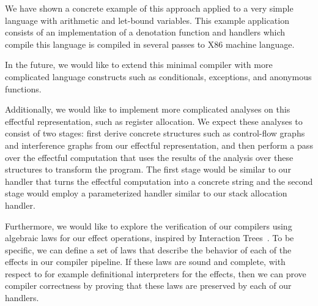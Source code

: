 \documentclass[a4paper,UKenglish,cleveref, autoref, thm-restate]{oasics-v2021}
\begin{document}
We have shown a concrete example of this approach applied to a very simple language with arithmetic and let-bound variables.
This example application consists of an implementation of a denotation function and handlers which compile this language is compiled in several passes to X86 machine language.

In the future, we would like to extend this minimal compiler with more complicated language constructs such as conditionals, exceptions, and anonymous functions.

Additionally, we would like to implement more complicated analyses on this effectful representation, such as register allocation.
We expect these analyses to consist of two stages: first derive concrete structures such as control-flow graphs and interference graphs from our effectful representation, and then perform a pass over the effectful computation that uses the results of the analysis over these structures to transform the program.
The first stage would be similar to our handler that turns the effectful computation into a concrete string and the second stage would employ a parameterized handler similar to our stack allocation handler.

Furthermore, we would like to explore the verification of our compilers using algebraic laws for our effect operations, inspired by Interaction Trees~\cite{10.1145/3371119}.
To be specific, we can define a set of laws that describe the behavior of each of the effects in our compiler pipeline.
If these laws are sound and complete, with respect to for example definitional interpreters for the effects, then we can prove compiler correctness by proving that these laws are preserved by each of our handlers.





\end{document}
